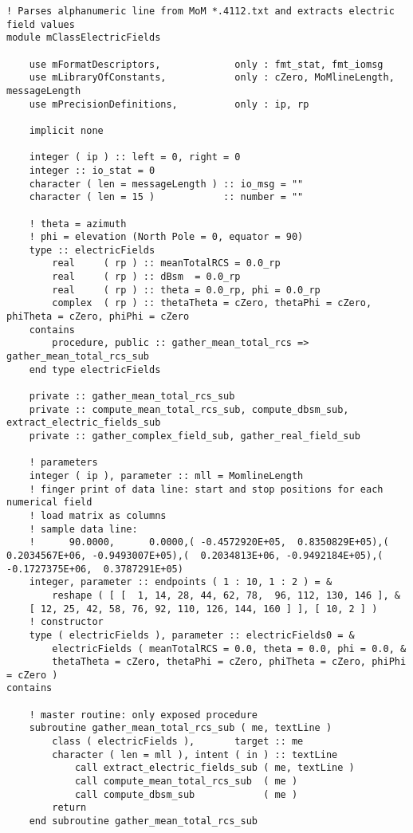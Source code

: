 % 

{\tiny{
\begin{lstlisting}
! Parses alphanumeric line from MoM *.4112.txt and extracts electric field values
module mClassElectricFields

    use mFormatDescriptors,             only : fmt_stat, fmt_iomsg
    use mLibraryOfConstants,            only : cZero, MoMlineLength, messageLength
    use mPrecisionDefinitions,          only : ip, rp

    implicit none

    integer ( ip ) :: left = 0, right = 0
    integer :: io_stat = 0
    character ( len = messageLength ) :: io_msg = ""
    character ( len = 15 )            :: number = ""

    ! theta = azimuth	
    ! phi = elevation (North Pole = 0, equator = 90)
    type :: electricFields
        real     ( rp ) :: meanTotalRCS = 0.0_rp
        real     ( rp ) :: dBsm  = 0.0_rp
        real     ( rp ) :: theta = 0.0_rp, phi = 0.0_rp
        complex  ( rp ) :: thetaTheta = cZero, thetaPhi = cZero, phiTheta = cZero, phiPhi = cZero
    contains
        procedure, public :: gather_mean_total_rcs => gather_mean_total_rcs_sub
    end type electricFields

    private :: gather_mean_total_rcs_sub
    private :: compute_mean_total_rcs_sub, compute_dbsm_sub, extract_electric_fields_sub
    private :: gather_complex_field_sub, gather_real_field_sub

    ! parameters
    integer ( ip ), parameter :: mll = MomlineLength
    ! finger print of data line: start and stop positions for each numerical field
    ! load matrix as columns
    ! sample data line:
    !      90.0000,      0.0000,( -0.4572920E+05,  0.8350829E+05),(  0.2034567E+06, -0.9493007E+05),(  0.2034813E+06, -0.9492184E+05),( -0.1727375E+06,  0.3787291E+05)
    integer, parameter :: endpoints ( 1 : 10, 1 : 2 ) = &
    	reshape ( [ [  1, 14, 28, 44, 62, 78,  96, 112, 130, 146 ], &
	[ 12, 25, 42, 58, 76, 92, 110, 126, 144, 160 ] ], [ 10, 2 ] )
    ! constructor
    type ( electricFields ), parameter :: electricFields0 = &
		electricFields ( meanTotalRCS = 0.0, theta = 0.0, phi = 0.0, &
		thetaTheta = cZero, thetaPhi = cZero, phiTheta = cZero, phiPhi = cZero )
contains

    ! master routine: only exposed procedure
    subroutine gather_mean_total_rcs_sub ( me, textLine )
        class ( electricFields ),       target :: me
        character ( len = mll ), intent ( in ) :: textLine
            call extract_electric_fields_sub ( me, textLine )
            call compute_mean_total_rcs_sub  ( me )
            call compute_dbsm_sub            ( me )
        return
    end subroutine gather_mean_total_rcs_sub


\end{lstlisting}}}
